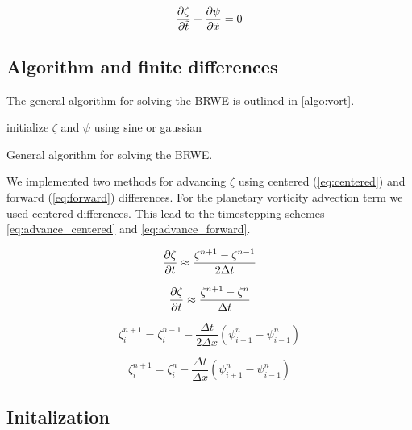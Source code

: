 \begin{equation}\label{eq:scaled_BRWE}
  \pdv{\zeta}{\tilde{t}} + \pdv{\psi}{\tilde{x}} = 0
\end{equation}


\subsection{Algorithm and finite differences}



The general algorithm for solving the BRWE is outlined in
\cref{algo:vort}.

\begin{algorithm}
  \SetAlgoLined
  initialize $\zeta$ and $\psi$ using sine or gaussian\\
  \caption{General algorithm for solving the BRWE.}
  \label{algo:vort}
\end{algorithm}

We implemented two methods for advancing $\zeta$ using centered
(\cref{eq:centered}) and forward (\cref{eq:forward}) differences.
For the planetary vorticity advection term we used centered differences.
This lead to the timestepping schemes \cref{eq:advance_centered} and
\cref{eq:advance_forward}.


\begin{equation} \label{eq:centered}
  \pdv{\zeta}{t} \approx \frac{\zeta_{}^{n+1} - \zeta_{}^{n-1}}{2 \Delta t}
\end{equation}

\begin{equation} \label{eq:forward}
  \pdv{\zeta}{t} \approx \frac{\zeta_{}^{n+1} - \zeta_{}^{n}}{\Delta t}
\end{equation}


\begin{equation} \label{eq:advance_centered}
  \zeta_{i}^{n+1} = \zeta_{i}^{n-1} - \frac{\Delta t}{2 \Delta x}
    (\psi_{i+1}^{n} - \psi_{i-1}^{n})
\end{equation}


\begin{equation}   \label{eq:advance_forward}
  \zeta_{i}^{n+1} = \zeta_{i}^{n} - \frac{\Delta t}{\Delta x} (\psi_{i+1}^{n} - \psi_{i-1}^{n})
\end{equation}


\subsection{Initalization}

